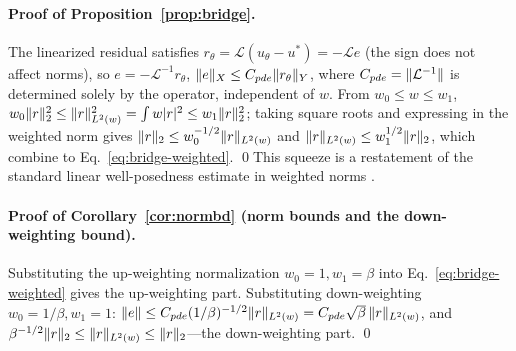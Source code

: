 \documentclass[11pt]{article}
\DeclarePairedDelimiter{\norm}{\lVert}{\rVert}
\newcommand{\Lop}{\mathcal L}
\numberwithin{equation}{section}
\begin{document}
\paragraph{Proof of Proposition~\ref{prop:bridge}.}
The linearized residual satisfies $r_\theta=\Lop(u_\theta-u^*)=-\Lop e$ (the sign does not affect norms), so $e=-\Lop^{-1}r_\theta$, $\norm e_X\le C_{pde}\norm{r_\theta}_Y$, where $C_{pde}=\norm{\Lop^{-1}}$ is determined solely by the operator, independent of $w$. From $w_0\le w\le w_1$, $w_0\norm r_2^2\le\norm r_{L^2(w)}^2=\int w|r|^2\le w_1\norm r_2^2$; taking square roots and expressing in the weighted norm gives $\norm r_2\le w_0^{-1/2}\norm r_{L^2(w)}$ and $\norm r_{L^2(w)}\le w_1^{1/2}\norm r_2$, which combine to Eq.~\eqref{eq:bridge-weighted}. \qed This squeeze is a restatement of the standard linear well-posedness estimate in weighted norms \cite{vanDerMeer2020,MishraMolinaro2020}.

\paragraph{Proof of Corollary~\ref{cor:normbd} (norm bounds and the down-weighting bound).}
Substituting the up-weighting normalization $w_0=1,w_1=\beta$ into Eq.~\eqref{eq:bridge-weighted} gives the up-weighting part. Substituting down-weighting $w_0=1/\beta,w_1=1$: $\norm e\le C_{pde}(1/\beta)^{-1/2}\norm r_{L^2(w)}=C_{pde}\sqrt\beta\,\norm r_{L^2(w)}$, and $\beta^{-1/2}\norm r_2\le\norm r_{L^2(w)}\le\norm r_2$---the down-weighting part. \qed
\end{document}
